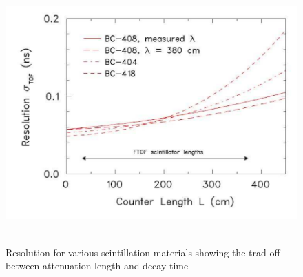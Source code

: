 \newpage


\begin{figure}[ht!]
\centerline{\includegraphics[width=13cm,height=10cm]{ye/fig_ye_scintillator/S2.pdf}}
\caption{Resolution for various scintillation materials showing the trad-off between attenuation length and decay time ~\cite{clasclas12}}
\label{f:tradeoff}
\end{figure}
